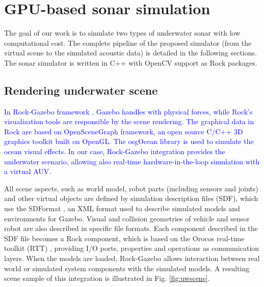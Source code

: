 \documentclass[final,5p,times]{elsarticle}
\begin{document}

\section{GPU-based sonar simulation}
\label{dev}

The goal of our work is to simulate two types of underwater sonar with low computational cost. The complete pipeline of the proposed simulator (from the virtual scene to the simulated acoustic data) is detailed in the following sections. The sonar simulator is written in C++ with OpenCV \cite{bradski2000} support as Rock packages.


\subsection{Rendering underwater scene}
\label{dev:uwscene}

\textcolor{blue}{In Rock-Gazebo framework \cite{watanabe2015}, Gazebo handles with physical forces, while Rock's visualization tools are responsible by the scene rendering. The graphical data in Rock are based on OpenSceneGraph framework, an open source C/C++ 3D graphics toolkit built on OpenGL. The osgOcean library is used to simulate the ocean visual effects. In our case, Rock-Gazebo integration provides the underwater scenario, allowing also real-time hardware-in-the-loop simulation with a virtual AUV.}

All scene aspects, such as world model, robot parts (including sensors and
joints) and other virtual objects are defined by simulation description files (SDF), which use the SDFormat \cite{sdformat2017}, an XML format used to describe simulated models and environments for Gazebo. Visual and collision geometries of vehicle and sensor robot are also described in specific file formats. Each component described in the SDF file becomes a Rock component, which is based on the Orocos real-time toolkit (RTT) \cite{soetens2005}, providing I/O ports, properties and operations as communication layers. When the models are loaded, Rock-Gazebo allows interaction between real world or simulated system components with the simulated models. A resulting scene sample of this integration is illustrated in Fig. \ref{fig:uwscene}.

\end{document}
